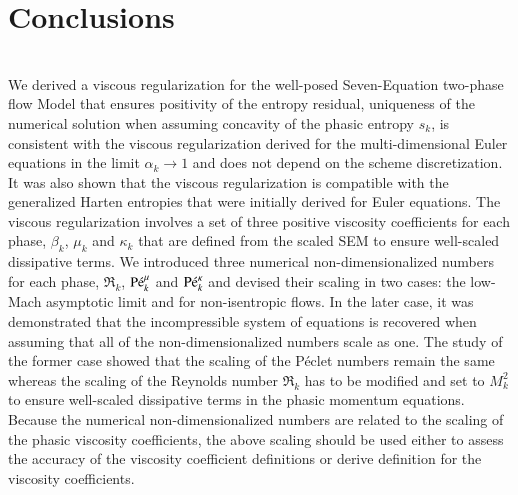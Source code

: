\documentclass[preprint,10pt]{elsarticle}
\begin{document}
{%
%
\section{Conclusions}\label{sec:conclusion}

\\
We derived a viscous regularization for the well-posed Seven-Equation two-phase flow Model that ensures positivity of the entropy residual, uniqueness of the numerical solution when assuming concavity of the phasic entropy $s_k$, is consistent with the viscous regularization derived for the multi-dimensional Euler equations in the limit $\alpha_k \to 1$ and does not depend on the scheme discretization. It was also shown that the viscous regularization is compatible with the generalized Harten entropies that were initially derived for Euler equations. The viscous regularization involves a set of three positive viscosity coefficients for each phase, $\beta_k$, $\mu_k$ and $\kappa_k$ that are defined from the scaled SEM to ensure well-scaled dissipative terms. We introduced three numerical non-dimensionalized numbers for each phase, $\Re_k$, $\textrm{P\'e}_k^\mu$ and $\textrm{P\'e}_k^\kappa$ and devised their scaling in two cases: the low-Mach asymptotic limit and for non-isentropic flows. In the later case, it was demonstrated that the incompressible system of equations is recovered when assuming that all of the non-dimensionalized numbers scale as one. The study of the former case showed that the scaling of the P\'eclet numbers remain the same whereas the scaling of the Reynolds number $\Re_k$ has to be modified and set to $M_k^2$ to ensure well-scaled dissipative terms in the phasic momentum equations. Because the numerical non-dimensionalized numbers are related to the scaling of the phasic viscosity coefficients, the above scaling should be used either to assess the accuracy of the viscosity coefficient definitions or derive definition for the viscosity coefficients. 

}
\end{document}

